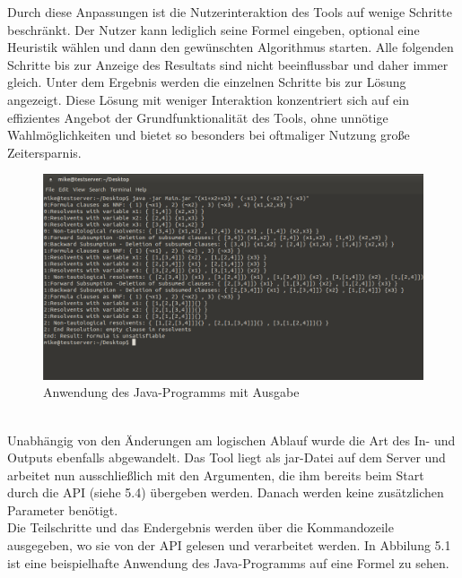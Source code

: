 Durch diese Anpassungen ist die Nutzerinteraktion des Tools auf wenige Schritte beschränkt. Der Nutzer kann lediglich seine Formel eingeben, optional eine Heuristik wählen und dann den gewünschten Algorithmus starten. Alle folgenden Schritte bis zur Anzeige des Resultats sind nicht beeinflussbar und daher immer gleich. Unter dem Ergebnis werden die einzelnen Schritte bis zur Lösung angezeigt. Diese Lösung mit weniger Interaktion konzentriert sich auf ein effizientes Angebot der Grundfunktionalität des Tools, ohne unnötige Wahlmöglichkeiten und bietet so besonders bei oftmaliger Nutzung große Zeitersparnis.\\
\begin{figure}[htb]
     \centerline{\includegraphics[width=14cm]{../Abbildungen/javaAusgabe.png}}
  \caption{Anwendung des Java-Programms mit Ausgabe}
  \label{fig1_1}
\end{figure}\\
Unabhängig von den Änderungen am logischen Ablauf wurde die Art des In- und Outputs ebenfalls abgewandelt. Das Tool liegt als jar-Datei auf dem Server und  arbeitet nun ausschließlich mit den Argumenten, die ihm bereits beim Start durch die API (siehe 5.4) übergeben werden. Danach werden keine zusätzlichen Parameter benötigt. \\
Die Teilschritte und das Endergebnis werden über die Kommandozeile ausgegeben, wo sie von der API gelesen und verarbeitet werden. In Abbilung 5.1 ist eine beispielhafte Anwendung des Java-Programms auf eine Formel zu sehen.\\

